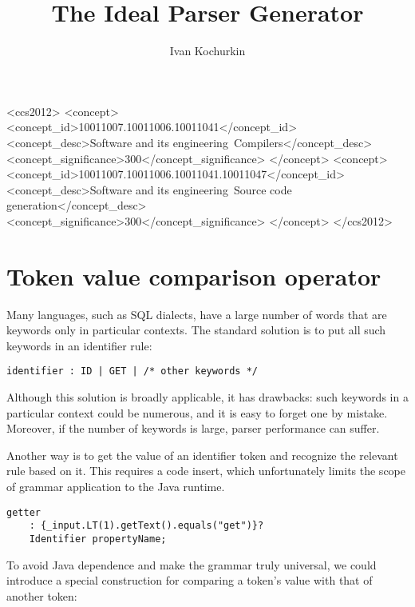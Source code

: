 \documentclass[sigplan,screen]{acmart}
\title{\LARGE \bf
The Ideal Parser Generator}
\author{Ivan Kochurkin}
\affiliation{%
  \institution{Positive Technologies}
  \city{Moscow}
  \country{Russia}
}
\begin{document}
\begin{CCSXML}
<ccs2012>
<concept>
<concept_id>10011007.10011006.10011041</concept_id>
<concept_desc>Software and its engineering~Compilers</concept_desc>
<concept_significance>300</concept_significance>
</concept>
<concept>
<concept_id>10011007.10011006.10011041.10011047</concept_id>
<concept_desc>Software and its engineering~Source code generation</concept_desc>
<concept_significance>300</concept_significance>
</concept>
</ccs2012>
\end{CCSXML}


\maketitle

\section{Token value comparison operator}

Many languages, such as SQL dialects, have a large number of words that
are keywords only in particular contexts. The standard solution is to
put all such keywords in an identifier rule:

\begin{verbatim}
identifier : ID | GET | /* other keywords */
\end{verbatim}

Although this solution is broadly applicable, it has drawbacks: such
keywords in a particular context could be numerous, and it is easy to
forget one by mistake. Moreover, if the number of keywords is large,
parser performance can suffer.

Another way is to get the value of an identifier token and recognize the
relevant rule based on it. This requires a code insert, which
unfortunately limits the scope of grammar application to the Java
runtime.

\begin{verbatim}
getter
    : {_input.LT(1).getText().equals("get")}?
    Identifier propertyName;
\end{verbatim}

To avoid Java dependence and make the grammar truly universal, we could
introduce a special construction for comparing a token's value with that
of another token:
\end{document}
